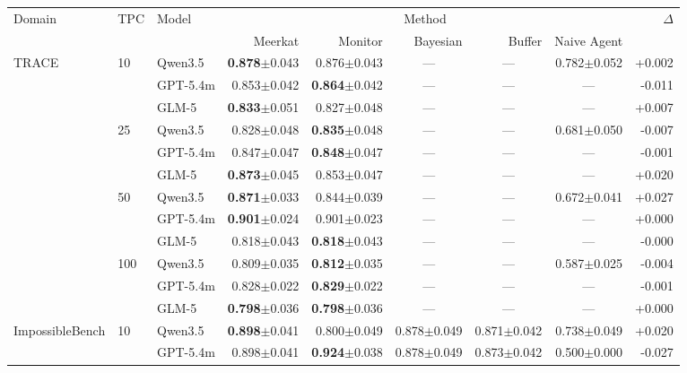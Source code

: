\documentclass{article} %
\newcommand{\res}[2]{#1{\scriptsize$\pm$#2}}
\newcommand{\bestres}[2]{\textbf{#1}{\scriptsize$\pm$#2}}
\newcommand{\na}{\multicolumn{1}{c}{---}}
\begin{document}
\begin{table}[t]
  \centering
  \tiny
  \begin{tabular}{@{}lllrrrrrr@{}}
    \toprule
    \multirow{2}{*}{Domain} & \multirow{2}{*}{TPC} & \multirow{2}{*}{Model}
      & \multicolumn{5}{c}{Method} & \multirow{2}{*}{$\Delta$} \\
    \cmidrule(lr){4-8}
      & & & Meerkat & Monitor & Bayesian & Buffer & Naive Agent & \\
    \midrule
    \multirow{12}{*}{TRACE} & \multirow{3}{*}{10} & Qwen3.5 & \bestres{0.878}{0.043} & \res{0.876}{0.043} & \na & \na & \res{0.782}{0.052} & +0.002 \\
     & & GPT-5.4m & \res{0.853}{0.042} & \bestres{0.864}{0.042} & \na & \na & \na & -0.011 \\
     & & GLM-5 & \bestres{0.833}{0.051} & \res{0.827}{0.048} & \na & \na & \na & +0.007 \\
    \cmidrule(lr){2-9}
     & \multirow{3}{*}{25} & Qwen3.5 & \res{0.828}{0.048} & \bestres{0.835}{0.048} & \na & \na & \res{0.681}{0.050} & -0.007 \\
     & & GPT-5.4m & \res{0.847}{0.047} & \bestres{0.848}{0.047} & \na & \na & \na & -0.001 \\
     & & GLM-5 & \bestres{0.873}{0.045} & \res{0.853}{0.047} & \na & \na & \na & +0.020 \\
    \cmidrule(lr){2-9}
     & \multirow{3}{*}{50} & Qwen3.5 & \bestres{0.871}{0.033} & \res{0.844}{0.039} & \na & \na & \res{0.672}{0.041} & +0.027 \\
     & & GPT-5.4m & \bestres{0.901}{0.024} & \res{0.901}{0.023} & \na & \na & \na & +0.000 \\
     & & GLM-5 & \res{0.818}{0.043} & \bestres{0.818}{0.043} & \na & \na & \na & -0.000 \\
    \cmidrule(lr){2-9}
     & \multirow{3}{*}{100} & Qwen3.5 & \res{0.809}{0.035} & \bestres{0.812}{0.035} & \na & \na & \res{0.587}{0.025} & -0.004 \\
     & & GPT-5.4m & \res{0.828}{0.022} & \bestres{0.829}{0.022} & \na & \na & \na & -0.001 \\
     & & GLM-5 & \bestres{0.798}{0.036} & \bestres{0.798}{0.036} & \na & \na & \na & +0.000 \\
    \midrule
    \multirow{8}{*}{ImpossibleBench} & \multirow{2}{*}{10} & Qwen3.5 & \bestres{0.898}{0.041} & \res{0.800}{0.049} & \res{0.878}{0.049} & \res{0.871}{0.042} & \res{0.738}{0.049} & +0.020 \\
     & & GPT-5.4m & \res{0.898}{0.041} & \bestres{0.924}{0.038} & \res{0.878}{0.049} & \res{0.873}{0.042} & \res{0.500}{0.000} & -0.027 \\

\end{tabular}
\end{table}
\end{document}
